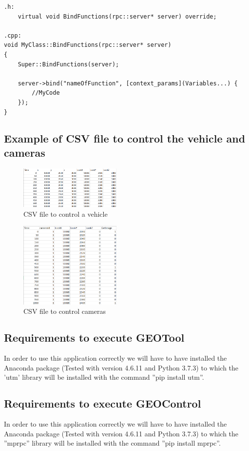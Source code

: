 \documentclass[10pt,a4paper,twocolumn,twoside]{article}
\begin{document}
\lstset{language=C} 
\begin{lstlisting}
.h:
	virtual void BindFunctions(rpc::server* server) override;
	
.cpp:
void MyClass::BindFunctions(rpc::server* server)
{
	Super::BindFunctions(server);

	server->bind("nameOfFunction", [context_params](Variables...) {
		//MyCode
	});
}

\end{lstlisting}

\subsection{Example of CSV file to control the vehicle and cameras}
\label{appendix:fitxerscsv}

\begin{figure}[!h]
\centering
  	\includegraphics[width=0.45\textwidth]{fitxervehicle}
	\captionsetup{labelformat=empty}
	\caption{CSV file to control a vehicle}
	\label{fig-fitxervehicle}
\end{figure}


\begin{figure}[!h]
\centering
  	\includegraphics[width=0.45\textwidth]{fitxercameres}
  	\captionsetup{labelformat=empty}
	\caption{CSV file to control cameras}
	\label{fig-fitxercameres}
\end{figure}

\newpage
\subsection{Requirements to execute GEOTool}
\label{appendix:requirementsgeotool}

In order to use this application correctly we will have to have installed the Anaconda package (Tested with version 4.6.11 and Python 3.7.3) to which the 'utm' library will be installed with the command ''pip install utm''.

\subsection{Requirements to execute GEOControl}
\label{appendix:requirementsgeocontrol}

In order to use this application correctly we will have to have installed the Anaconda package (Tested with version 4.6.11 and Python 3.7.3) to which the ''mprpc'' library will be installed with the command ''pip install mprpc''.
\end{document}
